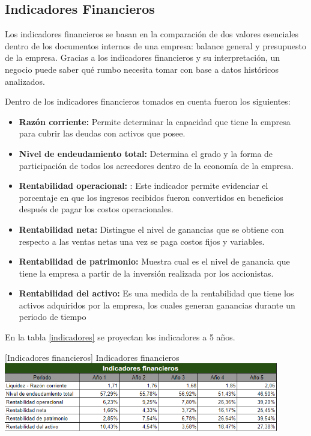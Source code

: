 \subsection{Indicadores Financieros}

Los indicadores financieros se basan en la comparación de dos valores esenciales dentro de los documentos internos de una empresa: balance general y presupuesto de la empresa. Gracias a los indicadores financieros y su interpretación, un negocio puede saber qué rumbo necesita tomar con base a datos históricos analizados. \cite{mundi_2022}

Dentro de los indicadores financieros tomados en cuenta fueron los siguientes:

\begin{itemize}
    \item \textbf{Razón corriente: } Permite determinar la capacidad que tiene la empresa para cubrir las deudas con activos que posee.
    
    \item \textbf{Nivel de endeudamiento total: } Determina el grado y la forma de participación de todos los acreedores dentro de la economía de la empresa.
    
    \item \textbf{Rentabilidad operacional: } : Este indicador permite evidenciar el porcentaje en que los ingresos recibidos fueron convertidos en beneficios después de pagar los costos operacionales.
    
    \item \textbf{Rentabilidad neta: } Distingue el nivel de ganancias que se obtiene con respecto a las ventas netas una vez se paga costos fijos y variables.
    
    \item \textbf{Rentabilidad de patrimonio: } Muestra cual es el nivel de ganancia que tiene la empresa a partir de la inversión realizada por los accionistas.
    
    \item \textbf{Rentabilidad del activo:} Es una medida de la rentabilidad que tiene los activos adquiridos por la empresa, los cuales generan ganancias durante un periodo de tiempo
\end{itemize}

En la tabla \ref{indicadores} se proyectan los indicadores a 5 años.

\vspace{2mm}
\begin{minipage}{0.9\textwidth}
\centering
{}[{Indicadores financieros}]{ Indicadores financieros}
\label{indicadores}
\includegraphics[width=0.9\textwidth]{Images/indicadoresFinancieros.png}
\end{minipage}


